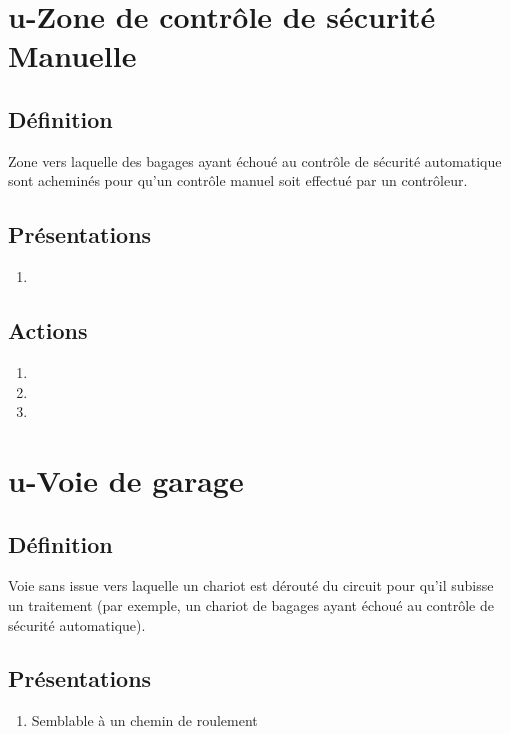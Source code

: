 \section{u-Zone de contrôle de sécurité Manuelle}
\subsection{Définition}
	Zone vers laquelle des bagages ayant échoué au contrôle de sécurité automatique sont acheminés pour qu'un contrôle manuel
	soit effectué par un contrôleur.

\subsection{Présentations}
\begin{enumerate}
	\item \rectetiquette
\end{enumerate}

\subsection{Actions}
\begin{enumerate}
	\item {}
	\item {}
	\item \transit
\end{enumerate}

\section{u-Voie de garage}
\subsection{Définition}
	Voie sans issue vers laquelle un chariot est dérouté du circuit pour qu'il subisse un traitement (par exemple, un chariot
	de bagages ayant échoué au contrôle de sécurité automatique).

\subsection{Présentations}
\begin{enumerate}
	\item Semblable à un chemin de roulement
\end{enumerate}


